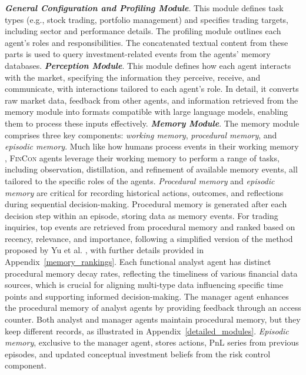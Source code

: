 \textit{\textbf{General Configuration and Profiling Module}}. This module defines task types (e.g., stock trading, portfolio management) and specifies trading targets, including sector and performance details. The profiling module outlines each agent’s roles and responsibilities. The concatenated textual content from these parts is used to query investment-related events from the agents' memory databases. \textit{\textbf{Perception Module}}. This module defines how each agent interacts with the market, specifying the information they perceive, receive, and communicate, with interactions tailored to each agent's role. In detail, it converts raw market data, feedback from other agents, and information retrieved from the memory module into formats compatible with large language models, enabling them to process these inputs effectively.
\textit{\textbf{Memory Module}}. The memory module comprises three key components: \textit{working memory}, \textit{procedural memory}, and \textit{episodic memory}. Much like how humans process events in their working memory \cite{wagner1999working}, \textsc{FinCon} agents leverage their working memory to perform a range of tasks, including observation, distillation, and refinement of available memory events, all tailored to the specific roles of the agents. \textit{Procedural memory} and \textit{episodic memory} are critical for recording historical actions, outcomes, and reflections during sequential decision-making. Procedural memory is generated after each decision step within an episode, storing data as memory events. For trading inquiries, top events are retrieved from procedural memory and ranked based on recency, relevance, and importance, following a simplified version of the method proposed by Yu et al. \cite{yu2023finmem}, with further details provided in Appendix~\ref{memory_rankings}. Each functional analyst agent has distinct procedural memory decay rates, reflecting the timeliness of various financial data sources, which is crucial for aligning multi-type data influencing specific time points and supporting informed decision-making. The manager agent enhances the procedural memory of analyst agents by providing feedback through an access counter. Both analyst and manager agents maintain procedural memory, but they keep different records, as illustrated in Appendix~\ref{detailed_modules}. \textit{Episodic memory}, exclusive to the manager agent, stores actions, PnL series from previous episodes, and updated conceptual investment beliefs from the risk control component.

